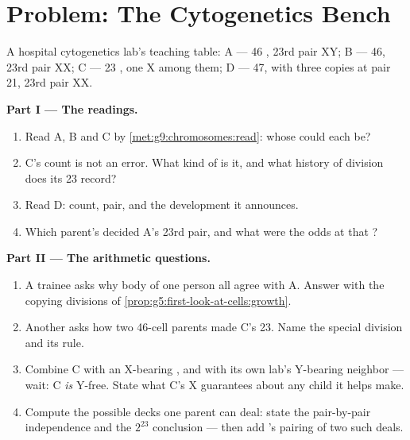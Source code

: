 \section{Problem: The Cytogenetics Bench}

\begin{problem}\label{pb:g9:chromosomes:1}
A hospital cytogenetics lab's teaching table:  A
--- 46 , 23rd pair XY; B --- 46, 23rd pair XX;
C --- 23 , one X among them; D --- 47, with
three copies at pair 21, 23rd pair XX.

\medskip\noindent\textbf{Part I --- The readings.}
\begin{enumerate}
  \item Read A, B and C by
        \cref{met:g9:chromosomes:read}: whose  could
        each be?
  \item C's count is not an error. What kind of  is
        it, and what history of division does its 23
        record?
  \item Read D: count, pair, and the development it
        announces.
  \item Which parent's  decided A's 23rd pair, and
        what were the odds at that ?
\end{enumerate}

\medskip\noindent\textbf{Part II --- The arithmetic
questions.}
\begin{enumerate}[resume]
  \item A trainee asks why body  of one person all
        agree with  A. Answer with the copying
        divisions of
        \cref{prop:g5:first-look-at-cells:growth}.
  \item Another asks how two 46-cell parents made C's 23.
        Name the special division and its rule.
  \item Combine C with an X-bearing , and with
        its own lab's Y-bearing neighbor --- wait: C
        \emph{is} Y-free. State what C's X guarantees
        about any child it helps make.
  \item Compute the possible decks one parent can deal:
        state the pair-by-pair independence and the
        $2^{23}$ conclusion --- then add 's
        pairing of two such deals.
\end{enumerate}


\end{problem}
